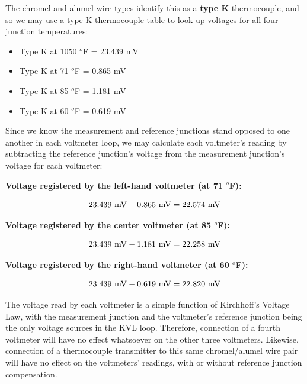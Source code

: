The chromel and alumel wire types identify this as a {\bf type K} thermocouple, and so we may use a type K thermocouple table to look up voltages for all four junction temperatures:

\begin{itemize}
\item{} Type K at 1050 $^{o}$F = 23.439 mV
\item{} Type K at 71 $^{o}$F = 0.865 mV
\item{} Type K at 85 $^{o}$F = 1.181 mV
\item{} Type K at 60 $^{o}$F = 0.619 mV
\end{itemize}

\vskip 10pt

Since we know the measurement and reference junctions stand opposed to one another in each voltmeter loop, we may calculate each voltmeter's reading by subtracting the reference junction's voltage from the measurement junction's voltage for each voltmeter:

\vskip 10pt

\noindent
{\bf Voltage registered by the left-hand voltmeter (at 71 $^{o}$F):}

$$23.439 \hbox{ mV} - 0.865 \hbox{ mV} = 22.574 \hbox{ mV}$$

\vskip 10pt

\noindent
{\bf Voltage registered by the center voltmeter (at 85 $^{o}$F):}

$$23.439 \hbox{ mV} - 1.181 \hbox{ mV} = 22.258 \hbox{ mV}$$

\vskip 10pt

\noindent
{\bf Voltage registered by the right-hand voltmeter (at 60 $^{o}$F):}

$$23.439 \hbox{ mV} - 0.619 \hbox{ mV} = 22.820 \hbox{ mV}$$

\vskip 10pt

The voltage read by each voltmeter is a simple function of Kirchhoff's Voltage Law, with the measurement junction and the voltmeter's reference junction being the only voltage sources in the KVL loop.  Therefore, connection of a fourth voltmeter will have no effect whatsoever on the other three voltmeters.  Likewise, connection of a thermocouple transmitter to this same chromel/alumel wire pair will have no effect on the voltmeters' readings, with or without reference junction compensation.










